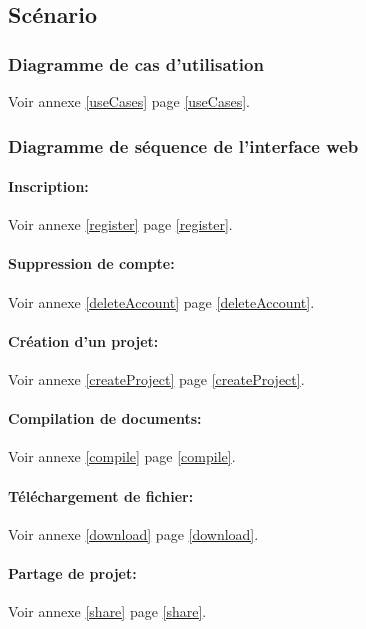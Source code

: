 \documentclass[a4paper,12pt]{article}
\begin{document}
\subsection{Scénario}
\subsubsection{Diagramme de cas d'utilisation}
Voir annexe \ref{useCases} page \ref{useCases}.

\subsubsection{Diagramme de séquence de l'interface web}

\paragraph{Inscription:\\}
Voir annexe \ref{register} page \ref{register}.

\paragraph{Suppression de compte:\\}
Voir annexe \ref{deleteAccount} page \ref{deleteAccount}.

\paragraph{Création d'un projet:\\}
Voir annexe \ref{createProject} page \ref{createProject}.

\paragraph{Compilation de documents:\\}
Voir annexe \ref{compile} page \ref{compile}.

\paragraph{Téléchargement de fichier:\\}
Voir annexe \ref{download} page \ref{download}.

\paragraph{Partage de projet:\\}
Voir annexe \ref{share} page \ref{share}.
\end{document}
